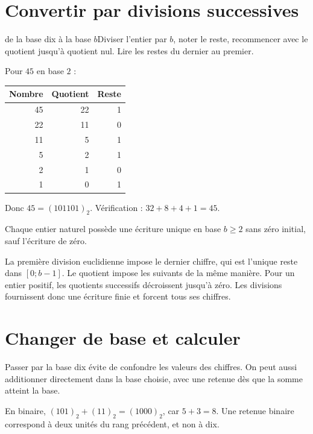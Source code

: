 \section{Convertir par divisions successives}
\begin{methode}{de la base dix à la base $b$}Diviser l’entier par $b$, noter le reste, recommencer avec le quotient jusqu’à quotient nul. Lire les restes du dernier au premier.\end{methode}
\begin{exemple}Pour $45$ en base $2$ :
\begin{center}\begin{tabular}{r|rr}\toprule
Nombre & Quotient & Reste\\\midrule
45&22&1\\22&11&0\\11&5&1\\5&2&1\\2&1&0\\1&0&1\\\bottomrule
\end{tabular}\end{center}
Donc $45=(101101)_2$. Vérification : $32+8+4+1=45$.
\end{exemple}
\begin{propriete}Chaque entier naturel possède une écriture unique en base $b\ge2$ sans zéro initial, sauf l’écriture de zéro.\end{propriete}
\begin{demonstration}La première division euclidienne impose le dernier chiffre, qui est l’unique reste dans $[0;b-1]$. Le quotient impose les suivants de la même manière. Pour un entier positif, les quotients successifs décroissent jusqu’à zéro. Les divisions fournissent donc une écriture finie et forcent tous ses chiffres.\end{demonstration}
\section{Changer de base et calculer}
Passer par la base dix évite de confondre les valeurs des chiffres. On peut aussi additionner directement dans la base choisie, avec une retenue dès que la somme atteint la base.
\begin{exemple}En binaire, $(101)_2+(11)_2=(1000)_2$, car $5+3=8$. Une retenue binaire correspond à deux unités du rang précédent, et non à dix.\end{exemple}


